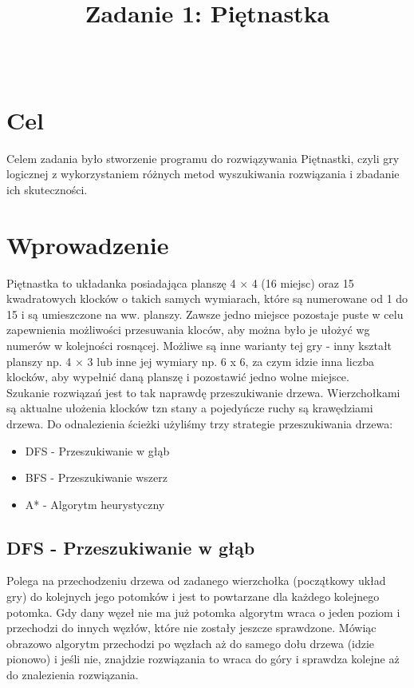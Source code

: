\documentclass{classrep}
\author{%
    \studentinfo{Jan Karwowski}{216793}\\
    \studentinfo{Kamil Kowalewski}{216806}%
}
\title{Zadanie 1: Piętnastka}
\begin{document}
    \maketitle
    \thispagestyle{fancyplain}

    \section{Cel} {
        Celem zadania było stworzenie programu do rozwiązywania Piętnastki, czyli
        gry logicznej z wykorzystaniem różnych metod wyszukiwania rozwiązania
        i zbadanie ich skuteczności.
    }
    \section{Wprowadzenie} {
        Piętnastka to układanka posiadająca planszę 4 × 4 (16 miejsc) oraz 15 kwadratowych
        klocków o takich samych wymiarach, które są numerowane od 1 do 15 i są umieszczone
        na ww. planszy. Zawsze jedno miejsce pozostaje puste w celu zapewnienia możliwości przesuwania
        kloców, aby można było je ułożyć wg numerów w kolejności rosnącej. Możliwe są inne
        warianty tej gry - inny kształt planszy np. 4 × 3 lub inne jej wymiary np. 6 x 6, za czym
        idzie inna liczba klocków, aby wypełnić daną planszę i pozostawić jedno wolne miejsce.\\

        Szukanie rozwiązań jest to tak naprawdę przeszukiwanie drzewa. Wierzchołkami są aktualne
        ułożenia klocków tzn stany a pojedyńcze ruchy są krawędziami drzewa. Do odnalezienia
        ścieżki użyliśmy trzy strategie przeszukiwania drzewa:
        \begin{itemize}
            \item{DFS} - Przeszukiwanie w głąb
            \item{BFS} - Przeszukiwanie wszerz
            \item{A*} - Algorytm heurystyczny
        \end{itemize}

        \subsection{DFS - Przeszukiwanie w głąb} {
            Polega na przechodzeniu drzewa od zadanego wierzchołka (początkowy układ gry)
            do kolejnych jego potomków i jest to powtarzane dla każdego kolejnego potomka. Gdy
            dany węzeł nie ma już potomka algorytm wraca o jeden poziom i przechodzi do innych
            węzłów, które nie zostały jeszcze sprawdzone. Mówiąc obrazowo algorytm przechodzi po
            węzłach aż do samego dołu drzewa (idzie pionowo) i jeśli nie, znajdzie rozwiązania to
            wraca do góry i sprawdza kolejne aż do znalezienia rozwiązania.
        }

}
\end{document}
